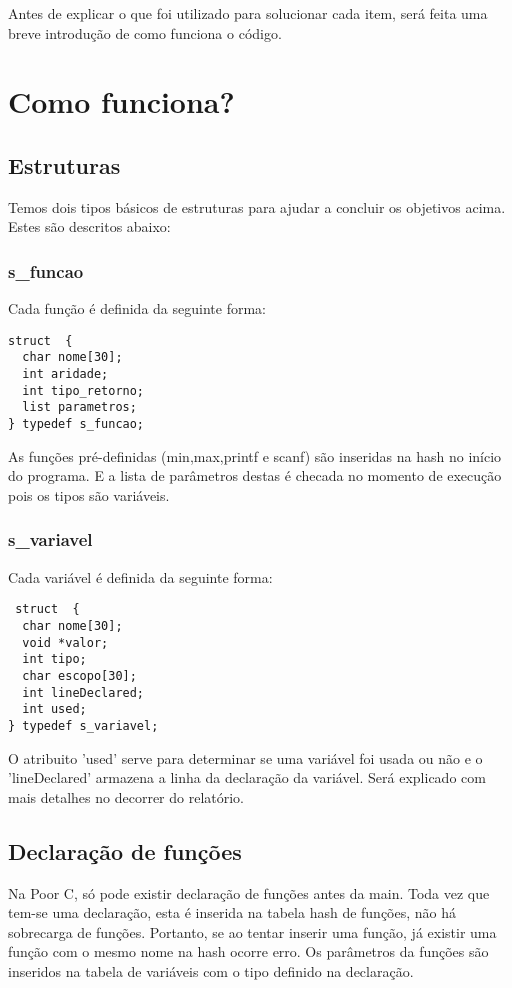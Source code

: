 \documentclass[a4paper,10pt]{article}
\begin{document}
Antes de explicar o que foi utilizado para solucionar cada item, será feita uma breve introdução de como funciona o código.

\section{Como funciona?}

\subsection{Estruturas}
Temos dois tipos básicos de estruturas para ajudar a concluir os objetivos acima. Estes são descritos abaixo:
\subsubsection{s\_funcao}

Cada função é definida da seguinte forma:

\begin{lstlisting}
struct  {
  char nome[30];
  int aridade;
  int tipo_retorno;
  list parametros;
} typedef s_funcao;
\end{lstlisting}

As funções pré-definidas (min,max,printf e scanf) são inseridas na hash no início do programa. E a lista de parâmetros destas é checada no momento de execução pois os tipos são
variáveis.

\subsubsection{s\_variavel}
Cada variável é definida da seguinte forma:
\begin{lstlisting}
 struct  {
  char nome[30];
  void *valor;
  int tipo;
  char escopo[30];
  int lineDeclared;
  int used;
} typedef s_variavel;
\end{lstlisting}

O atribuito 'used' serve para determinar se uma variável foi usada ou não e o 'lineDeclared' armazena a linha da declaração da variável. Será explicado com mais detalhes no decorrer do relatório.

\subsection{Declaração de funções}
Na Poor C, só pode existir declaração de funções antes da main. Toda vez que tem-se uma declaração, esta é inserida na tabela hash de funções, não há sobrecarga de funções. Portanto, se ao tentar
inserir uma função, já existir uma função com o mesmo nome na hash ocorre erro. Os parâmetros da funções são inseridos na tabela de variáveis com o tipo definido na declaração.
\end{document}
